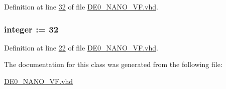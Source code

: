 Definition at line \hyperlink{_d_e0___n_a_n_o___v_f_8vhd_source_l00032}{32} of file \hyperlink{_d_e0___n_a_n_o___v_f_8vhd_source}{D\+E0\+\_\+\+N\+A\+N\+O\+\_\+\+V\+F.\+vhd}.

\hypertarget{class_d_e0___n_a_n_o___v_f_a9aab84a644aefaf58d2d687a1b235ff3}{}
\subsubsection[{T\+A\+M\+\_\+\+M\+E\+M}]{ {\bfseries \textcolor{vhdlchar}{ }} {\bfseries \textcolor{comment}{integer}\textcolor{vhdlchar}{ }\textcolor{vhdlchar}{ }\textcolor{vhdlchar}{\+:}\textcolor{vhdlchar}{=}\textcolor{vhdlchar}{ }\textcolor{vhdlchar}{ } \textcolor{vhdldigit}{32} \textcolor{vhdlchar}{ }} \hspace{0.3cm}{\ttfamily [Generic]}}\label{class_d_e0___n_a_n_o___v_f_a9aab84a644aefaf58d2d687a1b235ff3}


Definition at line \hyperlink{_d_e0___n_a_n_o___v_f_8vhd_source_l00022}{22} of file \hyperlink{_d_e0___n_a_n_o___v_f_8vhd_source}{D\+E0\+\_\+\+N\+A\+N\+O\+\_\+\+V\+F.\+vhd}.



The documentation for this class was generated from the following file\+:\begin{DoxyCompactItemize}
\item 
\hyperlink{_d_e0___n_a_n_o___v_f_8vhd}{D\+E0\+\_\+\+N\+A\+N\+O\+\_\+\+V\+F.\+vhd}\end{DoxyCompactItemize}
